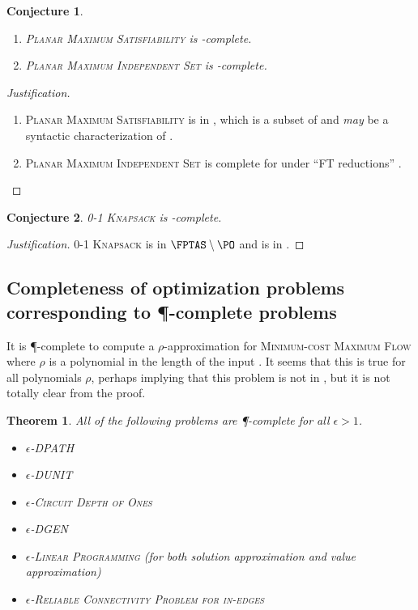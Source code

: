 \documentclass[]{article}
\theoremstyle{plain}
\newtheorem{conjecture}{Conjecture}
\newtheorem{theorem}{Theorem}
\theoremstyle{definition}
\newenvironment{justification}{\begin{proof}[Justification]}{\end{proof}}
\begin{document}
\begin{conjecture}
  \mbox{}
  \begin{enumerate}
  \item \textsc{Planar Maximum Satisfiability} is \NCAS-complete.
  \item \textsc{Planar Maximum Independent Set} is \NCAS-complete.
  \end{enumerate}
\end{conjecture}
\begin{justification}
  \mbox{}
  \begin{enumerate}
  \item \textsc{Planar Maximum Satisfiability} is in \PMPSAT, which is a subset of \PTAS{} and \emph{may} be a syntactic characterization of \PTAS{} \cite{km96}.
  \item \textsc{Planar Maximum Independent Set} is complete for \PTAS{} under ``FT reductions'' \cite[Theorem~6]{bep06}. \qedhere
  \end{enumerate}
\end{justification}

\begin{conjecture}
  \textsc{0-1 Knapsack} is \FNCAS-complete.
\end{conjecture}
\begin{justification}
  \textsc{0-1 Knapsack} is in $\FPTAS\setminus\PO$ \cite[Section~3.2]{ep10} and is in \FNCAS{} \cite[Theorem~2]{mayr88}.
\end{justification}

\subsection{Completeness of optimization problems corresponding to \texorpdfstring{\P}{P}-complete problems}
\label{sec:pcompleteapprox}

It is \P-complete to compute a $\rho$-approximation for \textsc{Minimum-cost Maximum Flow} where $\rho$ is a polynomial in the length of the input \cite{sw92}.
It seems that this is true for all polynomials $\rho$, perhaps implying that this problem is not in \polyApxNCO{}, but it is not totally clear from the proof.

\begin{theorem}
  All of the following problems are \P-complete for all $\epsilon > 1$.
  \begin{itemize}
  \item \textsc{$\epsilon$-DPATH} \cite[Theorem~1]{ss89}
  \item \textsc{$\epsilon$-DUNIT} \cite[Theorem~2]{ss89}
  \item \textsc{$\epsilon$-Circuit Depth of Ones} \cite{kl88}
  \item \textsc{$\epsilon$-DGEN} \cite[Theorem~4]{ss89}
  \item \textsc{$\epsilon$-Linear Programming} (for both solution approximation and value approximation) \cite{serna91}
  \item \textsc{$\epsilon$-Reliable Connectivity Problem for in-edges} \cite[Theorem~4]{kks91}
  \end{itemize}
\end{theorem}
\end{document}
